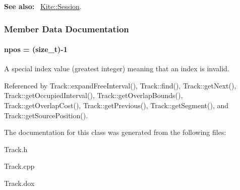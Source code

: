 {\bfseries See also\-:}~ \hyperlink{classKite_1_1Session}{Kite\-::\-Session}. 

\subsubsection{Member Data Documentation}
\hypertarget{classKite_1_1Track_ae0070ea45b2592ce3701ab9e486e58a0}{
\paragraph[{npos}]{\setlength{\rightskip}{0pt plus 5cm}npos = (size\-\_\-t)-\/1\hspace{0.3cm}{\ttfamily [static]}}}\label{classKite_1_1Track_ae0070ea45b2592ce3701ab9e486e58a0}
A special index value (greatest integer) meaning that an index is invalid. 

Referenced by Track\-::expand\-Free\-Interval(), Track\-::find(), Track\-::get\-Next(), Track\-::get\-Occupied\-Interval(), Track\-::get\-Overlap\-Bounds(), Track\-::get\-Overlap\-Cost(), Track\-::get\-Previous(), Track\-::get\-Segment(), and Track\-::get\-Source\-Position().



The documentation for this class was generated from the following files\-:\begin{DoxyCompactItemize}
\item 
Track.\-h\item 
Track.\-cpp\item 
Track.\-dox\end{DoxyCompactItemize}
